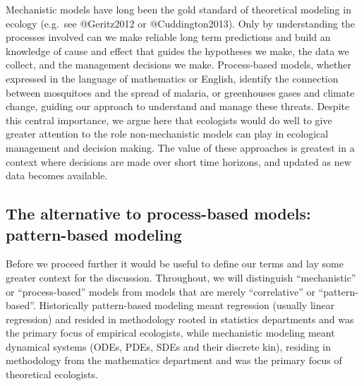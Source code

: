 \documentclass[author-year, review]{elsarticle} %
\begin{document}
Mechanistic models have long been the gold standard of theoretical
modeling in ecology (e.g.~see @Geritz2012 or @Cuddington2013). Only by
understanding the processes involved can we make reliable long term
predictions and build an knowledge of cause and effect that guides the
hypotheses we make, the data we collect, and the management decisions we
make. Process-based models, whether expressed in the language of
mathematics or English, identify the connection between mosquitoes and
the spread of malaria, or greenhouses gases and climate change, guiding
our approach to understand and manage these threats. Despite this
central importance, we argue here that ecologists would do well to give
greater attention to the role non-mechanistic models can play in
ecological management and decision making. The value of these approaches
is greatest in a context where decisions are made over short time
horizons, and updated as new data becomes available.

\subsection{The alternative to process-based models: pattern-based
modeling}

Before we proceed further it would be useful to define our terms and lay
some greater context for the discussion. Throughout, we will distinguish
``mechanistic'' or ``process-based'' models from models that are merely
``correlative'' or ``pattern-based''. Historically pattern-based
modeling meant regression (usually linear regression) and resided in
methodology rooted in statistics departments and was the primary focus
of empirical ecologists, while mechanistic modeling meant dynamical
systems (ODEs, PDEs, SDEs and their discrete kin), residing in
methodology from the mathematics department and was the primary focus of
theoretical ecologists.
\end{document}
